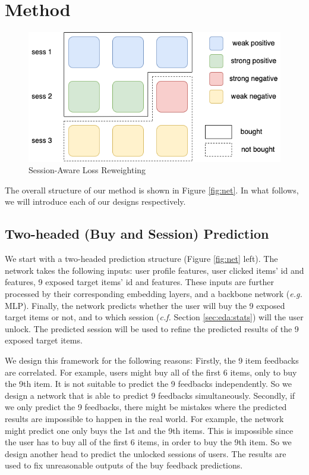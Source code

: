 \section{Method} \label{sec:method}

\begin{figure}[t!]
    \centering
    \includegraphics[width=0.5\linewidth]{figures/reweightloss.png}
    \caption{Session-Aware Loss Reweighting}
    \label{fig:reweightloss}
\end{figure}

The overall structure of our method is shown in Figure \ref{fig:net}. 
In what follows, we will introduce each of our designs respectively.


\subsection{Two-headed (Buy and Session) Prediction} \label{sec:method:twohead}
We start with a two-headed prediction structure (Figure \ref{fig:net} left).
The network takes the following inputs: user profile features, user clicked items' id and features, 9 exposed target items' id and features.
%
These inputs are further processed by their corresponding embedding layers, and a backbone network (\textit{e.g.} MLP).
%
Finally, the network predicts whether the user will buy the 9 exposed target items or not, and to which session (\textit{c.f.} Section \ref{sec:eda:stats}) will the user unlock.
%
The predicted session will be used to refine the predicted results of the 9 exposed target items.

We design this framework for the following reasons:
%
Firstly, the 9 item feedbacks are correlated. For example, users might buy all of the first 6 items, only to buy the 9th item. It is not suitable to predict the 9 feedbacks independently. So we design a network that is able to predict 9 feedbacks simultaneously.
%
Secondly, if we only predict the 9 feedbacks, there might be mistakes where the predicted results are impossible to happen in the real world. For example, the network might predict one only buys the 1st and the 9th items. This is impossible since the user has to buy all of the first 6 items, in order to buy the 9th item. So we design another head to predict the unlocked sessions of users. The results are used to fix unreasonable outputs of the buy feedback predictions.



